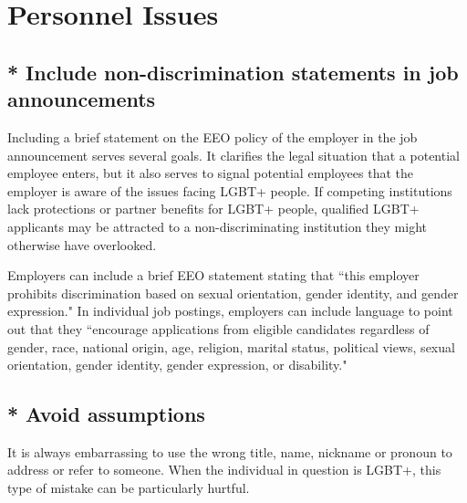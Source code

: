 %

\chapter{Personnel Issues}	%
\label{personnel-issues}		%
\normalsize			%

\section [* Include non-discrimination statements in job announcements]{* Include non-discrimination statements in job \\announcements}
\label{nondisc-statement}
Including a brief statement on the EEO policy of the employer in the job announcement serves several goals. It clarifies the legal situation that a potential employee enters, but it also serves to signal potential employees that the employer is aware of the issues facing LGBT+ people. If competing institutions lack protections or partner benefits for LGBT+ people, qualified LGBT+ applicants may be attracted to a non-discriminating institution they might otherwise have overlooked.

Employers can include a brief EEO statement stating that ``this employer prohibits discrimination based on sexual orientation, gender identity, and gender expression." In individual job postings, employers can include language to point out that they ``encourage applications from eligible candidates regardless of gender, race, national origin, age, religion, marital status, political views, sexual orientation, gender identity, gender expression, or disability."

\newpage
\section {* Avoid assumptions}
\label{assumptions}
It is always embarrassing to use the wrong title, name, nickname or pronoun to address or refer to someone. When the individual in question is LGBT+, this type of mistake can be particularly hurtful.

